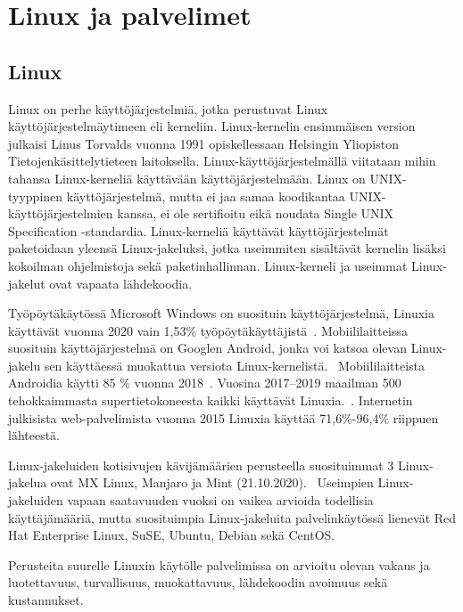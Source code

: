 \chapter{Linux ja palvelimet}\label{linux_ja_palvelimet}

\section{Linux}\label{linux}

Linux on perhe käyttöjärjestelmiä, jotka perustuvat Linux käyttöjärjestelmäytimeen eli kerneliin. Linux-kernelin ensimmäisen version julkaisi Linus Torvalds vuonna 1991 opiskellessaan Helsingin Yliopiston Tietojenkäsittelytieteen laitoksella. Linux-käyttöjärjestelmällä viitataan mihin tahansa Linux-kerneliä käyttävään käyttöjärjestelmään. Linux on UNIX-tyyppinen käyttöjärjestelmä, mutta ei jaa samaa koodikantaa UNIX-käyttöjärjestelmien kanssa, ei ole sertifioitu eikä noudata Single UNIX Specification -standardia. Linux-kerneliä käyttävät käyttöjärjestelmät paketoidaan yleensä Linux-jakeluksi, jotka useimmiten sisältävät kernelin lisäksi kokoilman ohjelmistoja sekä paketinhallinnan. Linux-kerneli ja useimmat Linux-jakelut ovat vapaata lähdekoodia.~\cite{openbookos}

Työpöytäkäytössä Microsoft Windows on suosituin käyttöjärjestelmä, Linuxia käyttävät vuonna 2020 vain 1,53\% työpöytäkäyttäjistä~\cite{statcounter}. Mobiililaitteissa suosituin käyttöjärjestelmä on Googlen Android, jonka voi katsoa olevan Linux-jakelu sen käyttäessä muokattua versiota Linux-kernelistä.~\cite{google_android} Mobiililaitteista Androidia käytti 85 \% vuonna 2018~\cite{statcounter}. Vuosina 2017–2019 maailman 500 tehokkaimmasta supertietokoneesta kaikki käyttävät Linuxia.~\cite{itsfoss}. Internetin julkisista web-palvelimista vuonna 2015 Linuxia käyttää 71,6\%-96,4\% riippuen lähteestä.~\cite{w3techs}~\cite{w3cook}

Linux-jakeluiden kotisivujen kävijämäärien perusteella suosituimmat 3 Linux-jakelua ovat MX Linux, Manjaro ja Mint (21.10.2020).~\cite{distrowatch} Useimpien Linux-jakeluiden vapaan saatavuuden vuoksi on vaikea arvioida todellisia käyttäjämääriä, mutta suosituimpia Linux-jakeluita palvelinkäytössä lienevät Red Hat Enterprise Linux, SuSE, Ubuntu, Debian sekä CentOS.~\cite{linuxcom}

Perusteita suurelle Linuxin käytölle palvelimissa on arvioitu olevan vakaus ja luotettavuus, turvallisuus, muokattavuus, lähdekoodin avoimuus sekä kustannukset.~\cite{linuxjournal}

